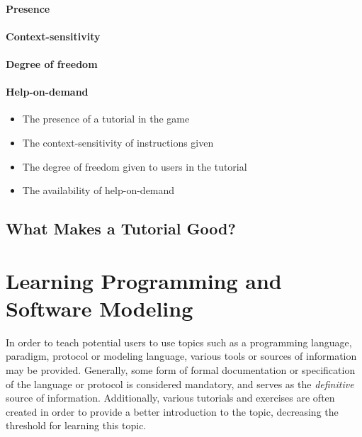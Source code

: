 \paragraph{Presence} 

\paragraph{Context-sensitivity}

\paragraph{Degree of freedom}

\paragraph{Help-on-demand}



\begin{itemize}
	\item The presence of a tutorial in the game
	\item The context-sensitivity of instructions given
	\item The degree of freedom given to users in the tutorial
	\item The availability of help-on-demand
\end{itemize}  


\subsection{What Makes a Tutorial Good?}


\section{Learning Programming and Software Modeling}
\label{sec:learning_programming}
In order to teach potential users to use topics such as a programming language, paradigm, protocol or modeling language, various tools or sources of information may be provided. Generally, some form of formal documentation or specification of the language or protocol is considered mandatory, and serves as the \emph{definitive} source of information. Additionally, various tutorials and exercises are often created in order to provide a better introduction to the topic, decreasing the threshold for learning this topic.

